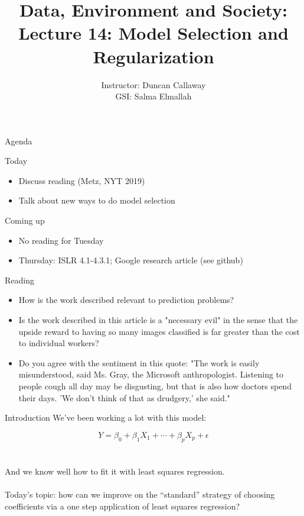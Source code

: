 \documentclass[mathserif, aspectratio=169]{beamer}
\title[Lecture 14] %
{Data, Environment and Society: \\{Lecture 14: Model Selection and Regularization}}
\author[ER131: Data, Environment and Society] 
{Instructor: Duncan Callaway\\
GSI: Salma Elmallah}
\institute[UC Berkeley] %
 {\small{ \bf October 17, 2019}}
\date[October 27, 2019]
\begin{document}
\frame{
  \titlepage
}
\begin{frame}{Agenda}

Today
\begin{itemize}
	\item Discuss reading (Metz, NYT 2019)
	\item Talk about new ways to do model selection
\end{itemize}

Coming up
\begin{itemize}
	\item No reading for Tuesday
	\item Thursday: ISLR 4.1-4.3.1; Google research article (see github) 
\end{itemize}

\end{frame}

\begin{frame}{Reading}

\begin{itemize}
	\item How is the work described relevant to prediction problems?  
	\item  Is the work described in this article is a "necessary evil" in the sense that the upside reward to having so many images classified is far greater than the cost to individual workers?
	\item  Do you agree with the sentiment in this quote: "The work is easily misunderstood, said Ms. Gray, the Microsoft anthropologist. Listening to people cough all day may be disgusting, but that is also how doctors spend their days. 'We don’t think of that as drudgery,' she said."
\end{itemize}


\end{frame}

\begin{frame}{Introduction}
We've been working a lot with this model:

\begin{equation*}
Y = \beta_0+\beta_1X_1+\cdots+\beta_pX_p+\epsilon
\end{equation*}\\~\\
And we know well how to fit it with least squares regression.\\~\\

Today's topic: how can we improve on the ``standard'' strategy of choosing coefficients via a one step application of least squares regression?\\~\\
\end{frame}
\end{document}

